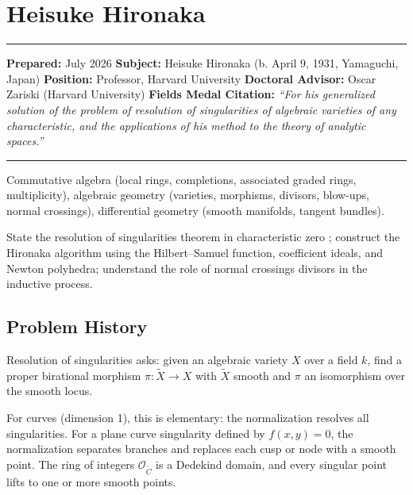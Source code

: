 \chapter{Heisuke Hironaka}\label{ch1970heisukehironaka:heisuke-hironaka-fields-medal-1970-a-comprehensive-report}

\begin{center}\rule{0.5\linewidth}{0.5pt}\end{center}

\textbf{Prepared:} July 2026
\textbf{Subject:} Heisuke Hironaka (b. April 9, 1931, Yamaguchi, Japan)
\textbf{Position:} Professor, Harvard University
\textbf{Doctoral Advisor:} Oscar Zariski (Harvard University)
\textbf{Fields Medal Citation:} \emph{``For his generalized solution of the problem of resolution of singularities of algebraic varieties of any characteristic, and the applications of his method to the theory of analytic spaces.''}

\begin{center}\rule{0.5\linewidth}{0.5pt}\end{center}

\begin{prereqs}
Commutative algebra (local rings, completions, associated graded rings, multiplicity), algebraic geometry (varieties, morphisms, divisors, blow-ups, normal crossings), differential geometry (smooth manifolds, tangent bundles).
\end{prereqs}

\begin{objectives}
State the resolution of singularities theorem in characteristic zero \cite{hironaka1964}; construct the Hironaka algorithm using the Hilbert--Samuel function, coefficient ideals, and Newton polyhedra; understand the role of normal crossings divisors in the inductive process.
\end{objectives}

\section{Problem History}

Resolution of singularities asks: given an algebraic variety $X$ over a field $k$, find a proper birational morphism $\pi: \tilde{X} \to X$ with $\tilde{X}$ smooth and $\pi$ an isomorphism over the smooth locus.

For curves (dimension 1), this is elementary: the normalization resolves all singularities. For a plane curve singularity defined by $f(x,y) = 0$, the normalization separates branches and replaces each cusp or node with a smooth point. The ring of integers $\mathcal{O}_{\tilde{C}}$ is a Dedekind domain, and every singular point lifts to one or more smooth points.

